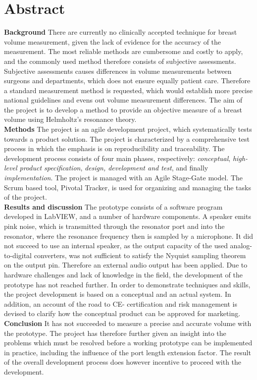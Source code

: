 \section*{Abstract}

\textbf{Background} There are currently no clinically accepted technique for breast volume measurement, given the lack of evidence for the accuracy of the measurement. The most reliable methods are cumbersome and costly to apply, and the commonly used method therefore consists of subjective assessments. Subjective assessments causes differences in volume measurements between surgeons and departments, which does not ensure equally patient care.  Therefore a standard measurement method is requested, which would establish more precise national guidelines and evens out volume measurement differences. The aim of the project is to develop a method to provide an objective measure of a breast volume using Helmholtz's resonance theory.\\
\textbf{Methods} The project is an agile development project, which systematically tests towards a product solution. The project is characterized by a comprehensive test process in which the emphasis is on reproducibility and traceability. The development process consists of four main phases, respectively: \textit{conceptual}, \textit{high-level product specification}, \textit{design, development and test}, and finally \textit{implementation}. The project is managed with an Agile Stage-Gate model. The Scrum based tool, Pivotal Tracker, is used for organizing and managing the tasks of the project. \\
\textbf{Results and discussion} The prototype consists of a software program developed in LabVIEW, and a number of hardware components. A speaker emits pink noise, which is transmitted through the resonator port and into the resonator, where the resonance frequency then is sampled by a microphone. It did not succeed to use an internal speaker, as the output capacity of the used analog-to-digital converters, was not sufficient to satisfy the Nyquist sampling theorem on the output pin. Therefore an external audio output has been applied. Due to hardware challenges and lack of knowledge in the field, the development of the prototype has not reached further. In order to demonstrate techniques and skills, the project development is based on a conceptual and an actual system. In addition, an account of the road to CE- certification and risk management is devised to clarify how the conceptual product can be approved for marketing.\\
\textbf{Conclusion} It has not succeeded to measure a precise and accurate volume with the prototype. The project has therefore further given an insight into the problems which must be resolved before a working prototype can be implemented in practice, including the influence of the port length extension factor. The result of the overall development process does however incentive to proceed with the development.
    